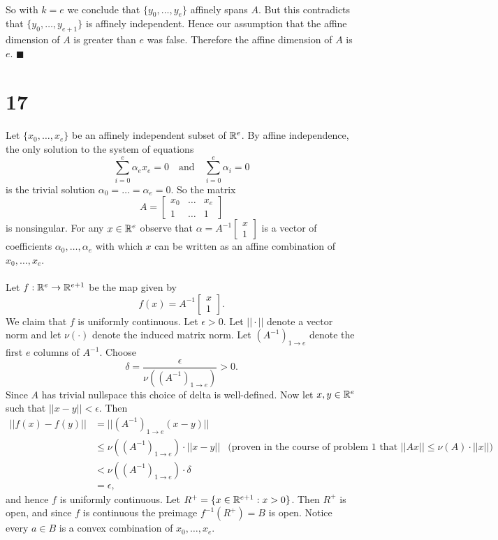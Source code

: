 \documentclass[letterpaper,12pt,oneside,onecolumn]{article}
\begin{document}
\paragraph{}
So with $k=e$ we conclude that $\{y_0, \dots, y_e\}$ affinely spans $A$. But this contradicts that $\{y_0, \dots, y_{e+1}\}$ is affinely independent. Hence our assumption that the affine dimension of $A$ is greater than $e$ was false. Therefore the affine dimension of $A$ is $e$. $\blacksquare$
\section*{17}
\paragraph{}
Let $\{x_0, \dots, x_e\}$ be an affinely independent subset of $\mathbb{R}^e$. By affine independence, the only solution to the system of equations
$$\sum_{i=0}^e \alpha_e x_e =0 \quad \text{and}\quad \sum_{i=0}^e\alpha_i = 0$$
is the trivial solution $\alpha_0 = \dots = \alpha_e = 0$. So the matrix $$A=\begin{bmatrix} x_0 &\dots & x_e\\ 1 & \dots & 1\end{bmatrix}$$
is nonsingular. For any $x \in \mathbb{R}^e$ observe that $\alpha=A^{-1}\begin{bmatrix}x\\1\end{bmatrix}$ is a vector of coefficients $\alpha_0, \dots, \alpha_e$ with which $x$ can be written as an affine combination of $x_0, \dots, x_e$.
\paragraph{}
Let $f : \mathbb{R}^e \rightarrow \mathbb{R}^{e+1}$ be the map given by $$f(x) = A^{-1}\begin{bmatrix}x\\1\end{bmatrix}.$$ We claim that $f$ is uniformly continuous. Let $\epsilon >0$. Let $||\cdot || $ denote a vector norm and let $\nu(\cdot)$ denote the induced matrix norm. Let $(A^{-1})_{1\rightarrow e}$ denote the first $e$ columns of $A^{-1}$. Choose $$\delta = \frac{\epsilon}{\nu((A^{-1})_{1\rightarrow e})} > 0.$$ Since $A$ has trivial nullspace this choice of delta is well-defined. Now let $x,y \in \mathbb{R}^e$ such that $||x-y|| < \epsilon$. Then
\begin{align*}
||f(x) - f(y)|| &= ||(A^{-1})_{1\rightarrow e}(x-y)|| \\
&\leq \nu((A^{-1})_{1\rightarrow e}) \cdot ||x-y||  &\text{(proven in the course of problem $1$ that $||Ax|| \leq \nu(A)\cdot ||x||$)}\\
&< \nu((A^{-1})_{1\rightarrow e}) \cdot \delta \\
&= \epsilon,
\end{align*}
and hence $f$ is uniformly continuous. Let $R^+ = \{x \in \mathbb{R}^{e+1} : x > 0 \}$. Then $R^+$ is open, and since $f$ is continuous the preimage $f^{-1}(R^+) = B$ is open. Notice every $a \in B$ is a convex combination of $x_0, \dots, x_e$.
\end{document}
